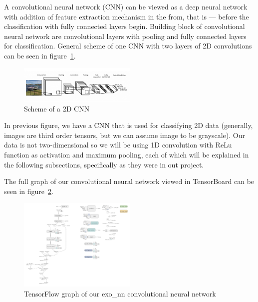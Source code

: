 \documentclass[twoside]{article}
\begin{document}
\begin{multicols}{2}
A convolutional neural network (CNN) can be viewed as a deep neural network with addition of feature extraction mechanism in the from, that is --- before the classification with fully connected layers begin. Building block of convolutional neural network are convolutional layers with pooling and fully connected layers for classification. General scheme of one CNN with two layers of 2D convolutions can be seen in figure~\ref{fig:cnn}.
\begin{figure}[H]
\includegraphics[width=0.5\textwidth]{cnn}
\caption{Scheme of a 2D CNN}
\label{fig:cnn}
\end{figure}

In previous figure, we have a CNN that is used for classifying 2D data (generally, images are third order tensors, but we can assume image to be grayscale). Our data is not two-dimensional so we will be using 1D convolution with ReLu function as activation and maximum pooling, each of which will be explained in the following subsections, specifically as they were in out project.

The full graph of our convolutional neural network viewed in TensorBoard can be seen in figure~\ref{fig:exo_tfgraph}.
\begin{figure}[H]
\includegraphics[width=0.5\textwidth]{exo_nn_tfgraph}
\caption{TensorFlow graph of our exo\_nn convolutional neural network}
\label{fig:exo_tfgraph}
\end{figure}


\end{multicols}
\end{document}

